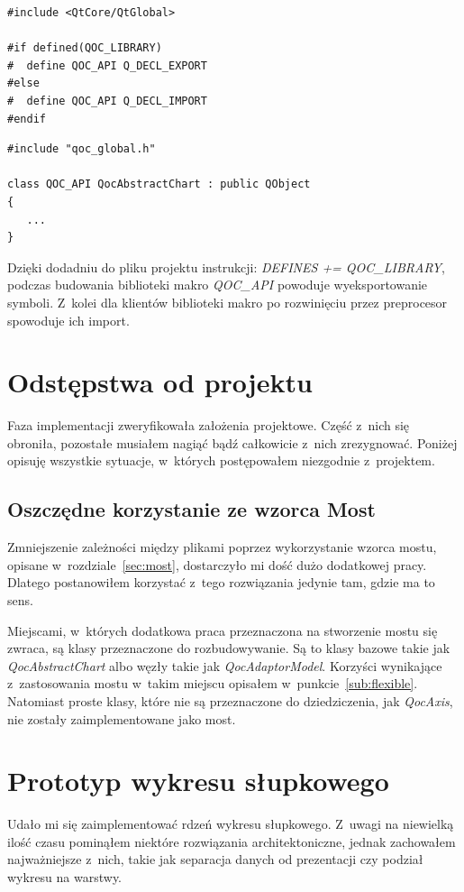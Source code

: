\begin{lstlisting}[caption=Zawartość pliku qoc\_global.h, label=code:qoc:global]
#include <QtCore/QtGlobal>

#if defined(QOC_LIBRARY)
#  define QOC_API Q_DECL_EXPORT
#else
#  define QOC_API Q_DECL_IMPORT
#endif
\end{lstlisting}

\begin{lstlisting}[caption=Eksport klasy QocAbstractChart, label=code:qoc:klasa]
#include "qoc_global.h"

class QOC_API QocAbstractChart : public QObject
{
   ...
}
\end{lstlisting}


Dzięki dodadniu do pliku projektu instrukcji: \textit{DEFINES +=  QOC\_LIBRARY}, podczas budowania biblioteki makro \textit{QOC\_API} powoduje wyeksportowanie symboli. Z~kolei dla klientów biblioteki makro po rozwinięciu przez preprocesor spowoduje ich import.


\section{Odstępstwa od projektu}
Faza implementacji zweryfikowała założenia projektowe. Część z~nich się obroniła, pozostałe musiałem nagiąć bądź całkowicie z~nich zrezygnować. Poniżej opisuję wszystkie sytuacje, w~których postępowałem niezgodnie z~projektem.

\subsection{Oszczędne korzystanie ze wzorca Most}
Zmniejszenie zależności między plikami poprzez wykorzystanie wzorca mostu, opisane w~rozdziale~\ref{sec:most}, dostarczyło mi dość dużo dodatkowej pracy. Dlatego postanowiłem korzystać z~tego rozwiązania jedynie tam, gdzie ma to sens.

Miejscami, w~których dodatkowa praca przeznaczona na stworzenie mostu się zwraca, są klasy przeznaczone do rozbudowywanie. Są to klasy bazowe takie jak \textit{QocAbstractChart} albo węzły takie jak \textit{QocAdaptorModel}. Korzyści wynikające z~zastosowania mostu w~takim miejscu opisałem w~punkcie~\ref{sub:flexible}. Natomiast proste klasy, które nie są przeznaczone do dziedziczenia, jak \textit{QocAxis}, nie zostały zaimplementowane jako most.


\section{Prototyp wykresu słupkowego}
Udało mi się zaimplementować rdzeń wykresu słupkowego. Z~uwagi na niewielką ilość czasu pominąłem niektóre rozwiązania architektoniczne, jednak zachowałem najważniejsze z~nich, takie jak separacja danych od prezentacji czy podział wykresu na warstwy. 

